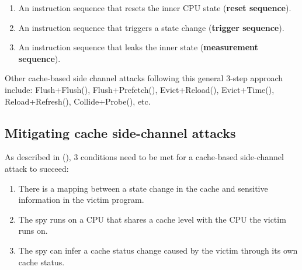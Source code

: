 \documentclass[
  a4paper,
]{report}
\providecommand{\tightlist}{%
  \setlength{\itemsep}{0pt}\setlength{\parskip}{0pt}}
\begin{document}
\begin{enumerate}
\def\labelenumi{\arabic{enumi}.}
\tightlist
\item
  An instruction sequence that resets the inner CPU state
  (\textbf{\label{__index_entry_126}{reset
  sequence}}).
\item
  An instruction sequence that triggers a state change
  (\textbf{\label{__index_entry_127}{trigger
  sequence}}).
\item
  An instruction sequence that leaks the inner state
  (\textbf{\label{__index_entry_128}{measurement
  sequence}}).
\end{enumerate}

Other cache-based side channel attacks following this general 3-step
approach include:
\label{__index_entry_129}{Flush+Flush}(),
\label{__index_entry_130}{Flush+Prefetch}(),
\label{__index_entry_131}{Evict+Reload}(),
\label{__index_entry_132}{Evict+Time}(),
\label{__index_entry_133}{Reload+Refresh}(),
\label{__index_entry_134}{Collide+Probe}(), etc.

\subsection{Mitigating cache side-channel
attacks}\label{mitigating-cache-side-channel-attacks}

As described in (), 3 conditions
need to be met for a cache-based side-channel attack to succeed:

\begin{enumerate}
\def\labelenumi{\arabic{enumi}.}
\tightlist
\item
  There is a mapping between a state change in the cache and sensitive
  information in the victim program.
\item
  The spy runs on a CPU that shares a cache level with the CPU the
  victim runs on.
\item
  The spy can infer a cache status change caused by the victim through
  its own cache status.
\end{enumerate}
\end{document}
